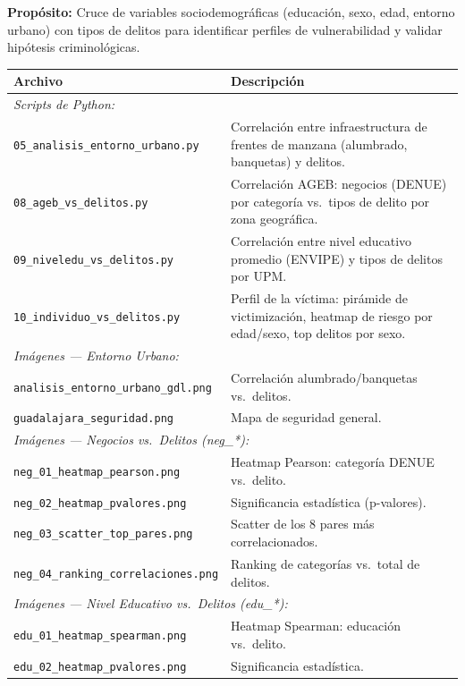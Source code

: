\documentclass[12pt, a4paper]{article}
\begin{document}
\textbf{Propósito:} Cruce de variables sociodemográficas (educación, sexo, edad, entorno urbano) con tipos de delitos para identificar perfiles de vulnerabilidad y validar hipótesis criminológicas.

\begin{table}[h!]
\centering
\small
\begin{tabular}{p{6cm} p{8cm}}
\toprule
\textbf{Archivo} & \textbf{Descripción} \\
\midrule
\multicolumn{2}{l}{\textit{Scripts de Python:}} \\
\addlinespace
\texttt{05\_analisis\_entorno\_urbano.py} & Correlación entre infraestructura de frentes de manzana (alumbrado, banquetas) y delitos. \\
\texttt{08\_ageb\_vs\_delitos.py} & Correlación AGEB: negocios (DENUE) por categoría vs.\ tipos de delito por zona geográfica. \\
\texttt{09\_niveledu\_vs\_delitos.py} & Correlación entre nivel educativo promedio (ENVIPE) y tipos de delitos por UPM. \\
\texttt{10\_individuo\_vs\_delitos.py} & Perfil de la víctima: pirámide de victimización, heatmap de riesgo por edad/sexo, top delitos por sexo. \\
\midrule
\multicolumn{2}{l}{\textit{Imágenes --- Entorno Urbano:}} \\
\addlinespace
\texttt{analisis\_entorno\_urbano\_gdl.png} & Correlación alumbrado/banquetas vs.\ delitos. \\
\texttt{guadalajara\_seguridad.png} & Mapa de seguridad general. \\
\midrule
\multicolumn{2}{l}{\textit{Imágenes --- Negocios vs.\ Delitos (neg\_*):}} \\
\addlinespace
\texttt{neg\_01\_heatmap\_pearson.png} & Heatmap Pearson: categoría DENUE vs.\ delito. \\
\texttt{neg\_02\_heatmap\_pvalores.png} & Significancia estadística (p-valores). \\
\texttt{neg\_03\_scatter\_top\_pares.png} & Scatter de los 8 pares más correlacionados. \\
\texttt{neg\_04\_ranking\_correlaciones.png} & Ranking de categorías vs.\ total de delitos. \\
\midrule
\multicolumn{2}{l}{\textit{Imágenes --- Nivel Educativo vs.\ Delitos (edu\_*):}} \\
\addlinespace
\texttt{edu\_01\_heatmap\_spearman.png} & Heatmap Spearman: educación vs.\ delito. \\
\texttt{edu\_02\_heatmap\_pvalores.png} & Significancia estadística. \\

\end{tabular}
\end{table}
\end{document}

